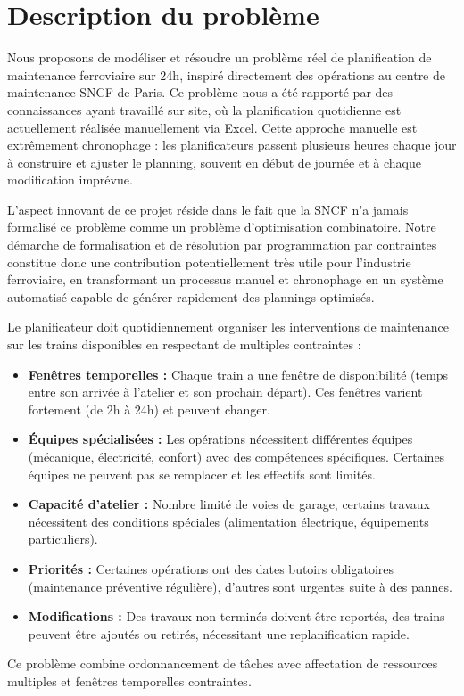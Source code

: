 \section*{Description du problème}

Nous proposons de modéliser et résoudre un problème réel de planification de maintenance ferroviaire sur 24h,
inspiré directement des opérations au centre de maintenance SNCF de Paris.
Ce problème nous a été rapporté par des connaissances ayant travaillé sur site,
où la planification quotidienne est actuellement réalisée manuellement via Excel.
Cette approche manuelle est extrêmement chronophage :
les planificateurs passent plusieurs heures chaque jour à construire et ajuster le planning,
souvent en début de journée et à chaque modification imprévue.

L'aspect innovant de ce projet réside dans le fait que la SNCF n'a jamais formalisé ce problème comme un problème d'optimisation combinatoire.
Notre démarche de formalisation et de résolution par programmation par contraintes constitue
donc une contribution potentiellement très utile pour l'industrie ferroviaire, en transformant un processus manuel et
chronophage en un système automatisé capable de générer rapidement des plannings optimisés.

Le planificateur doit quotidiennement organiser les interventions de maintenance sur les trains disponibles en respectant de multiples contraintes :

\begin{itemize}
	\item \textbf{Fenêtres temporelles :}
	      Chaque train a une fenêtre de disponibilité (temps entre son arrivée à l'atelier et son prochain départ).
	      Ces fenêtres varient fortement (de 2h à 24h) et peuvent changer.

	\item \textbf{Équipes spécialisées :}
	      Les opérations nécessitent différentes équipes (mécanique, électricité, confort) avec des compétences spécifiques.
	      Certaines équipes ne peuvent pas se remplacer et les effectifs sont limités.

	\item \textbf{Capacité d'atelier :}
	      Nombre limité de voies de garage, certains travaux nécessitent des conditions spéciales (alimentation électrique, équipements particuliers).

	\item \textbf{Priorités :}
	      Certaines opérations ont des dates butoirs obligatoires (maintenance préventive régulière), d'autres sont urgentes suite à des pannes.

	\item \textbf{Modifications :}
	      Des travaux non terminés doivent être reportés, des trains peuvent être ajoutés ou retirés, nécessitant une replanification rapide.
\end{itemize}

Ce problème combine ordonnancement de tâches avec affectation de ressources multiples et fenêtres temporelles contraintes.
